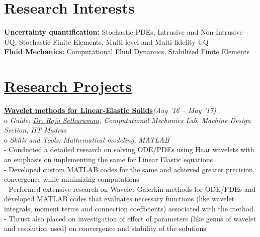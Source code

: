 \documentclass[margin,line]{res}
\begin{document}
\begin{resume}
\section {\sc Research Interests}
\textbullet\hspace{0.005cm} {\bf Uncertainty quantification:} Stochastic PDEs, Intrusive and Non-Intrusive UQ, Stochastic Finite Elements, Multi-level and Multi-fidelity UQ\\
\textbullet\hspace{0.005cm} {\bf Fluid Mechanics:} Computational Fluid Dynamics, Stabilized Finite Elements

\section {\sc \href{https://sites.google.com/site/vigneshsrinivasaragavan/research}{\color{RoyalPurple}Research Projects}}

\textbullet\hspace{0.005cm} \href{https://sites.google.com/site/vigneshsrinivasaragavan/research}{{\bf Wavelet methods for Linear-Elastic Solids}}\hfill {\em (Aug '16 -- May '17)}\\
o {\em Guide: \href {https://mech.iitm.ac.in/meiitm/personnal/raju-sethuraman/} {\color{RoyalPurple} Dr. Raju Sethuraman}, Computational Mechanics Lab, Machine Design Section, IIT Madras}\\
o {\em Skills and Tools:  Mathematical modeling, MATLAB}\\
- Conducted a detailed research on solving ODE/PDEs using Haar wavelets with an emphasis on implementing the same for Linear Elastic equations\\
- Developed custom MATLAB codes for the same and achieved greater precision, convergence while minimizing computations\\ 
- Performed extensive research on Wavelet-Galerkin methods for ODE/PDEs and developed MATLAB codes that evaluates necessary functions (like wavelet integrals, moment terms and connection coefficients) associated with the method\\
- Thrust also placed on investigation of effect of parameters (like genus of wavelet and resolution used) on convergence and stability of the solutions


\end{resume}
\end{document}
